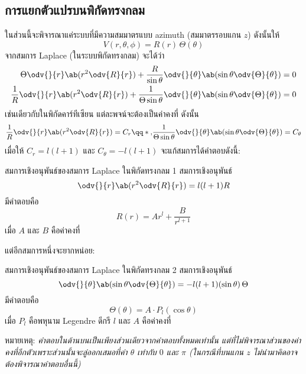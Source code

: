 \subsection{การแยกตัวแปรบนพิกัดทรงกลม}
ในส่วนนี้จะพิจารณาแค่ระบบที่มีความสมมาตรแบบ azimuth (สมมาตรรอบแกน $z$) ดังนั้นให้
\[
V(r,\theta,\phi)=R(r)\,\Theta(\theta)
\]
จากสมการ Laplace (ในระบบพิกัดทรงกลม) จะได้ว่า
\begin{align*}
    \Theta\odv{}{r}\ab(r^2\odv{R}{r})+\frac{R}{\sin\theta}\odv{}{\theta}\ab(\sin\theta\odv{\Theta}{\theta})&=0\\
    \frac{1}{R}\odv{}{r}\ab(r^2\odv{R}{r})+\frac{1}{\Theta\sin\theta}\odv{}{\theta}\ab(\sin\theta\odv{\Theta}{\theta})&=0
\end{align*}
เช่นเดียวกับในพิกัดคาร์ทีเซียน แต่ละพจน์จะต้องเป็นค่าคงที่ ดังนั้น
\[
\frac{1}{R}\odv{}{r}\ab(r^2\odv{R}{r})=C_r\qq*{,}\frac{1}{\Theta\sin\theta}\odv{}{\theta}\ab(\sin\theta\odv{\Theta}{\theta})=C_\theta
\]
เมื่อให้ $C_r=l(l+1)$ และ $C_\theta=-l(l+1)$ จะแก้สมการได้คำตอบดังนี้:
\begin{lawbox}{สมการเชิงอนุพันธ์ของสมการ Laplace ในพิกัดทรงกลม 1}
    สมการเชิงอนุพันธ์
    \begin{equation}
        \odv{}{r}\ab(r^2\odv{R}{r})=l(l+1)R
    \end{equation}
    มีคำตอบคือ
    \begin{equation}
        R(r)=Ar^l+\frac{B}{r^{l+1}}\label{sphere1}
    \end{equation}
    เมื่อ $A$ และ $B$ คือค่าคงที่
\end{lawbox}
แต่อีกสมการหนึ่งจะยากหน่อย:
\begin{lawbox}{สมการเชิงอนุพันธ์ของสมการ Laplace ในพิกัดทรงกลม 2}
    สมการเชิงอนุพันธ์
    \begin{equation}
        \odv{}{\theta}\ab(\sin\theta\odv{\Theta}{\theta})=-l(l+1)(\sin\theta)\,\Theta
    \end{equation}
    มีคำตอบคือ
    \begin{equation}
        \Theta(\theta)=A\cdot P_l(\cos\theta)\label{sphere2}
    \end{equation}
    เมื่อ $P_l$ คือพหุนาม Legendre ดีกรี $l$ และ $A$ คือค่าคงที่
\end{lawbox}
หมายเหตุ: \emph{คำตอบในด้านบนเป็นเพียงส่วนเดียวจากคำตอบทั้งหมดเท่านั้น แต่ที่ไม่พิจารณาส่วนของค่าคงที่อีกตัวเพราะส่วนนั้นจะลู่ออกเสมอที่ค่า $\theta$ เท่ากับ $0$ และ $\pi$ (ในกรณีที่บนแกน $z$ ไม่นำมาคิดอาจต้องพิจารณาคำตอบอื่นนี้)}

